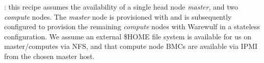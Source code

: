 : this recipe assumes the availability of a single head node
{\em master}, and two {\em compute} nodes. The {\em master} node is
provisioned with \baseOS{} and is subsequently configured to
provision the remaining {\em compute} nodes with Warewulf in a
stateless configuration. We assume an external \$HOME file system is
available for us on master/computes via NFS, and that compute node BMCs are
available via IPMI from the chosen master host. \\


